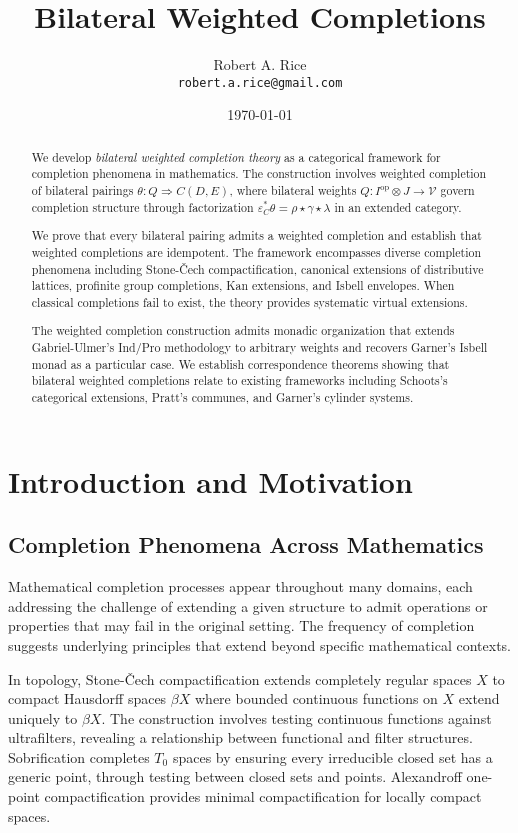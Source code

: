 \documentclass[11pt]{article}
\title{Bilateral Weighted Completions}
\author{Robert A. Rice\\
\texttt{robert.a.rice@gmail.com}}
\date{\today}
\theoremstyle{plain}
\theoremstyle{definition}
\theoremstyle{remark}
\newcommand{\V}{\mathcal{V}}
\newcommand{\op}{\mathrm{op}}
\begin{document}
\maketitle

\begin{abstract}
We develop \emph{bilateral weighted completion theory} as a categorical framework for completion phenomena in mathematics. The construction involves weighted completion of bilateral pairings $\theta : Q \Rightarrow C(D,E)$, where bilateral weights $Q : I^{\op} \otimes J \to \V$ govern completion structure through factorization $\varepsilon_C^* \theta = \rho \star \gamma \star \lambda$ in an extended category.

We prove that every bilateral pairing admits a weighted completion and establish that weighted completions are idempotent. The framework encompasses diverse completion phenomena including Stone-\v{C}ech compactification, canonical extensions of distributive lattices, profinite group completions, Kan extensions, and Isbell envelopes. When classical completions fail to exist, the theory provides systematic virtual extensions.

The weighted completion construction admits monadic organization that extends Gabriel-Ulmer's Ind/Pro methodology to arbitrary weights and recovers Garner's Isbell monad as a particular case. We establish correspondence theorems showing that bilateral weighted completions relate to existing frameworks including Schoots's categorical extensions, Pratt's communes, and Garner's cylinder systems.
\end{abstract}

\section{Introduction and Motivation}

\subsection{Completion Phenomena Across Mathematics}

Mathematical completion processes appear throughout many domains, each addressing the challenge of extending a given structure to admit operations or properties that may fail in the original setting. The frequency of completion suggests underlying principles that extend beyond specific mathematical contexts.

In topology, Stone-\v{C}ech compactification \cite{stone1936theory} extends completely regular spaces $X$ to compact Hausdorff spaces $\beta X$ where bounded continuous functions on $X$ extend uniquely to $\beta X$. The construction involves testing continuous functions against ultrafilters, revealing a relationship between functional and filter structures. Sobrification \cite{johnstone1982stone} completes $T_0$ spaces by ensuring every irreducible closed set has a generic point, through testing between closed sets and points. Alexandroff one-point compactification \cite{alexandroff1924point} provides minimal compactification for locally compact spaces.
\end{document}
